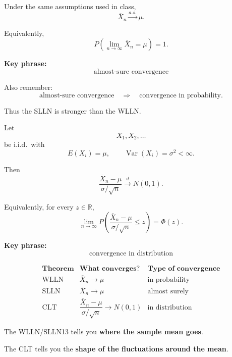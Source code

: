 \documentclass[11pt]{article}
\begin{document}
\begin{toolbox}

Under the same assumptions used in class,
\[
\overline X_n\xrightarrow{a.s.}\mu.
\]

Equivalently,
\[
P\left(
\lim_{n\to\infty}\overline X_n=\mu
\right)
=
1.
\]

\textbf{Key phrase:}
\[
\boxed{\text{almost-sure convergence}}
\]

Also remember:
\[
\text{almost-sure convergence}
\quad\Longrightarrow\quad
\text{convergence in probability}.
\]

Thus the SLLN is stronger than the WLLN.
\end{toolbox}

\begin{toolbox}

Let
\[
X_1,X_2,\dots
\]
be i.i.d.\ with
\[
E(X_i)=\mu,
\qquad
\operatorname{Var}(X_i)=\sigma^2<\infty.
\]

Then
\[
\frac{\overline X_n-\mu}{\sigma/\sqrt n}
\xrightarrow{d}
N(0,1).
\]

Equivalently, for every \(z\in\mathbb R\),
\[
\lim_{n\to\infty}
P\left(
\frac{\overline X_n-\mu}{\sigma/\sqrt n}
\leq z
\right)
=
\Phi(z).
\]

\textbf{Key phrase:}
\[
\boxed{\text{convergence in distribution}}
\]
\end{toolbox}

\begin{warningbox}

\[
\begin{array}{c|c|c}
\textbf{Theorem}
&
\textbf{What converges?}
&
\textbf{Type of convergence}
\\
\hline
\text{WLLN}
&
\overline X_n\to\mu
&
\text{in probability}
\\[1mm]
\text{SLLN}
&
\overline X_n\to\mu
&
\text{almost surely}
\\[1mm]
\text{CLT}
&
\dfrac{\overline X_n-\mu}{\sigma/\sqrt n}
\to N(0,1)
&
\text{in distribution}
\end{array}
\]

The WLLN/SLLN13 tells you \textbf{where the sample mean goes}.

The CLT tells you the \textbf{shape of the fluctuations around the mean}.
\end{warningbox}

 
\end{document}
